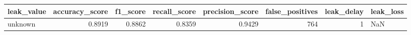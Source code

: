 \begin{tabular}{lrrrrrrl}
\toprule
leak\_value & accuracy\_score & f1\_score & recall\_score & precision\_score & false\_positives & leak\_delay & leak\_loss \\
\midrule
unknown & 0.8919 & 0.8862 & 0.8359 & 0.9429 & 764 & 1 & NaN \\
\bottomrule
\end{tabular}
